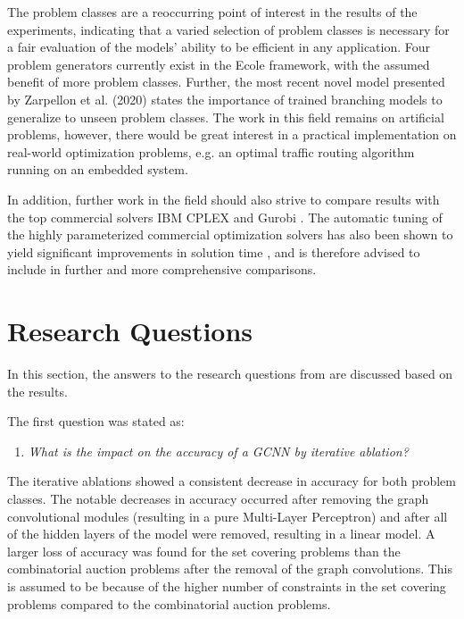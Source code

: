 The problem classes are a reoccurring point of interest in the results of the experiments, indicating that a varied selection of problem classes is necessary for a fair evaluation of the models' ability to be efficient in any application. Four problem generators currently exist in the \gls{Ecole} framework, with the assumed benefit of more problem classes. Further, the most recent novel model presented by Zarpellon et al. (2020) \cite{zarpellon2020parameterizing} states the importance of trained branching models to generalize to unseen problem classes.
The work in this field remains on artificial problems, however, there would be great interest in a practical implementation on real-world optimization problems, e.g. an optimal traffic routing algorithm running on an embedded system. 

In addition, further work in the field should also strive to compare results with the top commercial solvers IBM CPLEX and Gurobi \cite{anand2017comparative}. The automatic tuning of the highly parameterized commercial optimization solvers has also been shown to yield significant improvements in solution time \cite{hutter2010automated}, and is therefore advised to include in further and more comprehensive comparisons.   





\section{Research Questions}\label{sec:dis_questions}

In this section, the answers to the research questions from  are discussed based on the results. 

The first question was stated as:
%
\begin{enumerate}[label=(\roman*)]
    \item \textit{What is the impact on the accuracy of a \gls{GCNN} by iterative ablation?}
\end{enumerate}
%
The iterative ablations showed a consistent decrease in accuracy for both problem classes. The notable decreases in accuracy occurred after removing the graph convolutional modules (resulting in a pure Multi-Layer Perceptron) and after all of the hidden layers of the model were removed, resulting in a linear model. A larger loss of accuracy was found for the set covering problems than the combinatorial auction problems after the removal of the graph convolutions.
This is assumed to be because of the higher number of constraints in the set covering problems compared to the combinatorial auction problems. 

